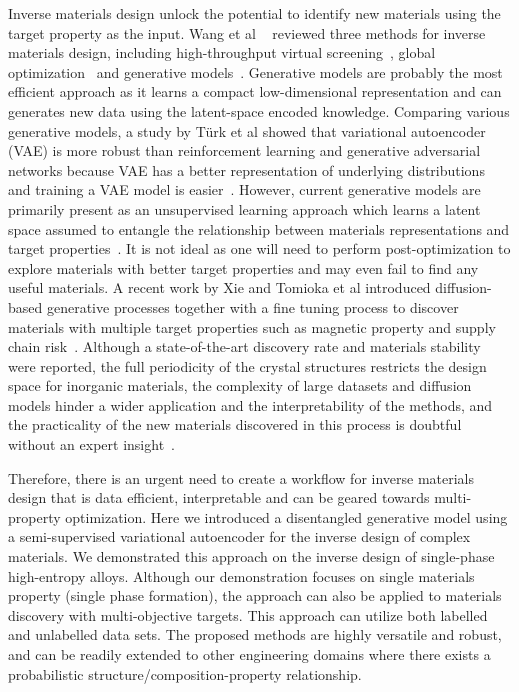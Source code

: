 \documentclass[a4paper]{article}
\begin{document}
Inverse materials design unlock the potential to identify new materials using the target property as the input.
Wang et al ~\cite{wang2022} reviewed three methods for inverse materials design, including high-throughput virtual screening~\cite{afzal2019}, global optimization~\cite{geng2019} and generative models~\cite{ma2019, popova2018}.
Generative models are probably the most efficient approach as it learns a compact low-dimensional representation and can generates new data using the latent-space encoded knowledge.
Comparing various generative models, a study by T\"{u}rk et al showed that variational autoencoder (VAE) is more robust than reinforcement learning and generative adversarial networks because VAE has a better representation of underlying distributions and training a VAE model is easier~\cite{turk2022}.
However, current generative models are primarily present as an unsupervised learning approach which learns a latent space assumed to entangle the relationship between materials representations and target properties~\cite{chen2020, wang2022}.
It is not ideal as one will need to perform post-optimization to explore materials with better target properties and may even fail to find any useful materials.
A recent work by Xie and Tomioka et al introduced diffusion-based generative processes together with a fine tuning process to discover materials with multiple target properties such as magnetic property and supply chain risk~\cite{zeni2024}.
Although a state-of-the-art discovery rate and materials stability were reported, the full periodicity of the crystal structures restricts the design space for inorganic materials, the complexity of large datasets and diffusion models hinder a wider application and the interpretability of the methods, and the practicality of the new materials discovered in this process is doubtful without an expert insight~\cite{cheetham2024}.

Therefore, there is an urgent need to create a workflow for inverse materials design that is data efficient, interpretable and can be geared towards multi-property optimization.
Here we introduced a disentangled generative model using a semi-supervised variational autoencoder for the inverse design of complex materials.
We demonstrated this approach on the inverse design of single-phase high-entropy alloys.
Although our demonstration focuses on single materials property (single phase formation), the approach can also be applied to materials discovery with multi-objective targets.
This approach can utilize both labelled and unlabelled data sets. The proposed methods are highly versatile and robust, and can be readily extended to other engineering domains where there exists a probabilistic structure/composition-property relationship.
\end{document}
